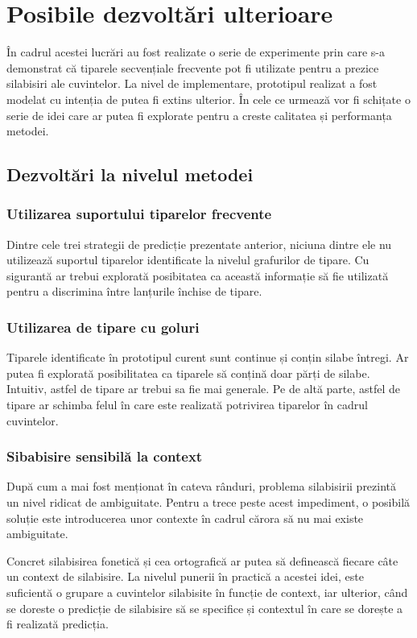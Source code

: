\chapter{Posibile dezvoltări ulterioare}

În cadrul acestei lucrări au fost realizate o serie de experimente prin care s-a demonstrat că tiparele secvențiale frecvente pot fi utilizate pentru a prezice silabisiri ale cuvintelor. La nivel de implementare, prototipul realizat a fost modelat cu intenția de putea fi extins ulterior. În cele ce urmează vor fi schițate o serie de idei care ar putea fi explorate pentru a creste calitatea și performanța metodei.


\section{Dezvoltări la nivelul metodei}

\subsection{Utilizarea suportului tiparelor frecvente}
Dintre cele trei strategii de predicție prezentate anterior, niciuna dintre ele nu utilizează suportul tiparelor identificate la nivelul grafurilor de tipare. Cu sigurantă ar trebui explorată posibitatea ca această informație să fie utilizată pentru a discrimina între lanțurile închise de tipare.

\subsection{Utilizarea de tipare cu goluri}
Tiparele identificate în prototipul curent sunt continue și conțin silabe întregi. Ar putea fi explorată posibilitatea ca tiparele să conțină doar părți de silabe. Intuitiv, astfel de tipare ar trebui sa fie mai generale. 
Pe de altă parte, astfel de tipare ar schimba felul în care este realizată potrivirea tiparelor în cadrul cuvintelor.

\subsection{Sibabisire sensibilă la context}
După cum a mai fost menționat în cateva rânduri, problema silabisirii prezintă un nivel ridicat de ambiguitate. Pentru a trece peste acest impediment, o posibilă soluție este introducerea unor contexte în cadrul cărora să nu mai existe ambiguitate. 

Concret silabisirea fonetică și cea ortografică ar putea să definească fiecare câte un context de silabisire. La nivelul punerii în practică a acestei idei, este suficientă o grupare a cuvintelor silabisite în funcție de context, iar ulterior, când se doreste o predicție de silabisire să se specifice și contextul în care se dorește a fi realizată predicția.

